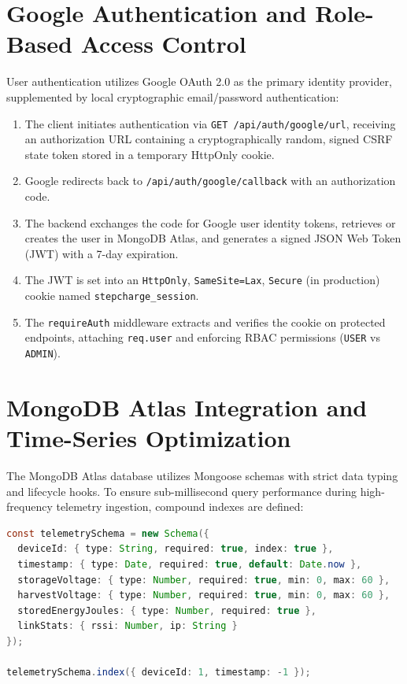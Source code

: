 \section{Google Authentication and Role-Based Access Control}
User authentication utilizes Google OAuth 2.0 as the primary identity provider, supplemented by local cryptographic email/password authentication:
\begin{enumerate}
    \item The client initiates authentication via \texttt{GET /api/auth/google/url}, receiving an authorization URL containing a cryptographically random, signed CSRF state token stored in a temporary HttpOnly cookie.
    \item Google redirects back to \texttt{/api/auth/google/callback} with an authorization code.
    \item The backend exchanges the code for Google user identity tokens, retrieves or creates the user in MongoDB Atlas, and generates a signed JSON Web Token (JWT) with a 7-day expiration.
    \item The JWT is set into an \texttt{HttpOnly}, \texttt{SameSite=Lax}, \texttt{Secure} (in production) cookie named \texttt{stepcharge\_session}.
    \item The \texttt{requireAuth} middleware extracts and verifies the cookie on protected endpoints, attaching \texttt{req.user} and enforcing RBAC permissions (\texttt{USER} vs \texttt{ADMIN}).
\end{enumerate}

\section{MongoDB Atlas Integration and Time-Series Optimization}
The MongoDB Atlas database utilizes Mongoose schemas with strict data typing and lifecycle hooks. To ensure sub-millisecond query performance during high-frequency telemetry ingestion, compound indexes are defined:
\begin{lstlisting}[language=Java, caption={Mongoose compound indexing on time-series telemetry.}, label={lst:mongo_index}]
const telemetrySchema = new Schema({
  deviceId: { type: String, required: true, index: true },
  timestamp: { type: Date, required: true, default: Date.now },
  storageVoltage: { type: Number, required: true, min: 0, max: 60 },
  harvestVoltage: { type: Number, required: true, min: 0, max: 60 },
  storedEnergyJoules: { type: Number, required: true },
  linkStats: { rssi: Number, ip: String }
});

telemetrySchema.index({ deviceId: 1, timestamp: -1 });
\end{lstlisting}

